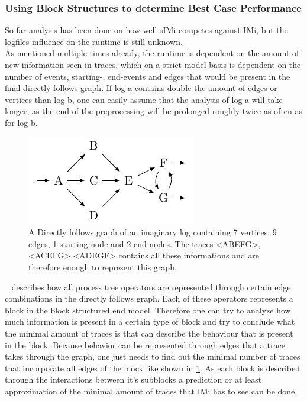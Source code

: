 \documentclass[
	a4paper,
	pagesize,
	pdftex,
	12pt,
	twoside, %
	BCOR=5mm, %
	ngerman,
	fleqn,
	final,
	]{scrartcl}
\begin{document}
\subsubsection{Using Block Structures to determine Best Case Performance}
So far analysis has been done on how well sIMi competes against IMi, but the logfiles influence on the runtime is still unknown.\\ As mentioned multiple times already, the runtime is dependent on the amount of new information seen in traces, which on a strict model basis is dependent on the number of events, starting-, end-events and edges that would be present in the final directly follows graph. If log a contains double the amount of edges or vertices than log b, one can easily assume that the analysis of log a will take longer, as the end of the preprocessing will be prolonged roughly twice as often as for log b.\\
\begin{figure}
  \vspace{-20pt}
	\begin{center}
		\includegraphics{img/petriNet_traceCoverage.pdf}
	\end{center}
	  \vspace{-10pt}
	\caption{A Directly follows graph of an imaginary log containing 7 vertices, 9 edges, 1 starting node and 2 end nodes. The traces <ABEFG>,<ACEFG>,<ADEGF> contains all these informations and are therefore enough to represent this graph.}
	\label{fig:directlyFollowsCoverageExample}
\end{figure}
~\cite{InductiveMiner} describes how all process tree operators are represented through certain edge combinations in the directly follows graph. Each of these operators represents a block in the block structured end model. Therefore one can try to analyze how much information is present in a certain type of block and try to conclude what the minimal amount of traces is that can describe the behaviour that is present in the block. Because behavior can be represented through edges that a trace takes through the graph, one just needs to find out the minimal number of traces that incorporate all edges of the block like shown in \ref{fig:directlyFollowsCoverageExample}.
As each block is described through the interactions between it's subblocks a prediction or at least approximation of the minimal amount of traces that IMi has to see can be done.\\
\end{document}
